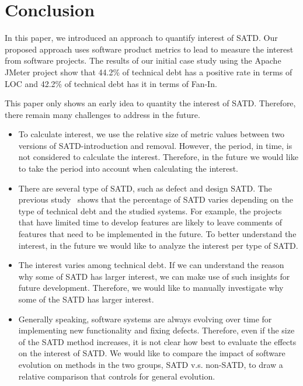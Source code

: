 \section{Conclusion} \label{conclusion}
%
In this paper, we introduced an approach to quantify interest of SATD. Our proposed approach uses
software product metrics to lead to measure the interest from software projects. The results of our initial case study using the Apache JMeter project
show that 44.2\% of technical debt has a positive rate in terms of LOC and 42.2\% of technical debt has it in terms of Fan-In.

 This paper only shows an early idea to quantity the interest of SATD. Therefore, there remain
many challenges to address in the future. 

\begin{itemize}
\item To calculate interest, we use the relative size of metric values between two versions of SATD-introduction and removal. However, the period, in time, is not considered to calculate the interest. Therefore, in the future we would like to take the period into account when calculating the interest.
\item  There are several type of SATD, such as defect and design SATD.
The previous study~\cite{Maldonado2015MTD} shows that the percentage of SATD varies depending on the type of technical debt and the studied systems. For example, the projects that have limited time to develop features are likely to leave comments of features that need to be implemented in the future. 
To better understand the interest, in the future we would like to analyze the interest per type of SATD.
\item  The interest varies among technical debt. If we can understand the reason why some of SATD has larger interest, we can make use of such insights for future development. Therefore, we would like to manually investigate why some of the SATD has larger interest.
\item Generally speaking, software systems are always evolving over time for implementing new functionality and fixing defects.
Therefore, even if the size of the SATD method increases, it is not clear how best to evaluate the effects on the interest of SATD.
We would like to compare the impact of software evolution on methods in the two groups, SATD v.s. non-SATD, to draw a relative comparison that controls for general evolution.
\end{itemize}
